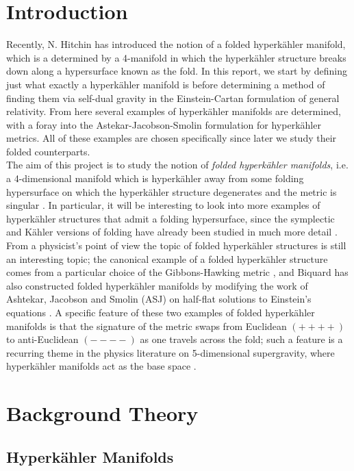\documentclass[a4paper,12pt, onecolumn, notitlepage]{article}
\theoremstyle{definition}
\theoremstyle{remark}
\newcommand{\K}{K\"ahler }
\newcommand{\HK}{hyperk\"ahler }
\begin{document}
\section{Introduction}
Recently, N. Hitchin has introduced the notion of a folded \HK manifold, which is a determined by a 4-manifold in which the \HK structure breaks down along a hypersurface known as the fold. In this report, we start by defining just what exactly a \HK manifold is before determining a method of finding them via self-dual gravity in the Einstein-Cartan formulation of general relativity. From here several examples of \HK manifolds are determined, with a foray into the Astekar-Jacobson-Smolin formulation for \HK metrics. All of these examples are chosen specifically since later we study their folded counterparts.\\
The aim of this project is to study the notion of \emph{folded hyperk{\"a}hler manifolds}, i.e. a 4-dimensional manifold which is hyperk{\"a}hler away from some folding hypersurface on which the hyperk{\"a}hler structure degenerates and the metric is singular \cite{hitchin_2015,biquard_2015}. In particular, it will be interesting to look into more examples of \HK structures that admit a folding hypersurface, since the symplectic and \K versions of folding have already been studied in much more detail \cite{dasilva_2000,baykur_2006}.\\
From a physicist's point of view the topic of folded \HK structures is still an interesting topic; the canonical example of a folded \HK structure comes from a particular choice of the Gibbons-Hawking metric \cite{hitchin_2015}, and Biquard \cite{biquard_2015} has also constructed folded \HK manifolds by modifying the work of Ashtekar, Jacobson and Smolin (ASJ) on half-flat solutions to Einstein's equations \cite{ashtekar_1988}. A specific feature of these two examples of folded \HK manifolds is that the signature of the metric swaps from Euclidean $(++++)$ to anti-Euclidean $(----)$ as one travels across the fold; such a feature is a recurring theme in the physics literature on 5-dimensional supergravity, where \HK manifolds act as the base space \cite{gibbons_2013}.


\section{Background Theory}
\subsection{Hyperk\"ahler Manifolds}
\end{document}

